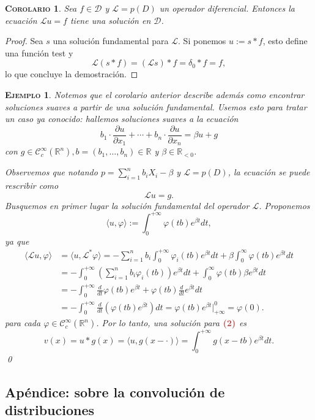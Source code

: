 \documentclass[11pt]{article}
\theoremstyle{colored}
\newtheorem{corollary}{\scshape Corolario}
\newtheorem{example}{\scshape Ejemplo}
\newcommand{\R}{\mathbb{R}}
\newcommand{\C}{\mathscr{C}}
\newcommand{\test}{\mathscr{D}}
\newcommand{\ev}[1]{\langle #1 \rangle}
\renewcommand{\L}{\mathscr{L}}
\newcommand{\paint}[1]{\color{color}{#1}}
\newcommand{\tpaint}[1]{\paint{\textbf{#1}}}
\begin{document}
\begin{corollary} Sea $f \in \test$ y $\L = p(D)$ un operador diferencial. Entonces la ecuación $\L u = f$ tiene una solución en $\test$.
\end{corollary}
\begin{proof} Sea $s$ una solución fundamental para $\L$. Si ponemos $u := s \ast f$, esto define una función test y
\[
\L (s \ast f) = (\L s) \ast f = \delta_0 \ast f = f,
\]
lo que concluye la demostración.
\end{proof}

\begin{example} Notemos que el corolario anterior describe además como encontrar soluciones suaves a partir de una solución fundamental. Usemos esto para tratar un caso ya conocido: hallemos soluciones suaves a la ecuación
\[
b_1 \cdot \frac{\partial u}{\partial x_1} + \cdots + b_n \cdot \frac{\partial u}{\partial x_n} = \beta u + g \tag{2}
\]
con $g \in \C_c^\infty(\R^n), b = (b_1, \dots, b_n) \in \R$ y $\beta \in \R_{ < 0}$. 

Observemos que notando $p = \sum_{i=1}^n b_i X_i - \beta$ y $\L = p(D)$, la ecuación se puede rescribir como
\[
\L u = g.
\]
Busquemos en primer lugar la solución fundamental del operador $\L$. Proponemos 
\[
\ev{u,\varphi} := \int_{0}^{+\infty}\varphi(tb)e^{\beta t}dt,
\]
ya que
\begin{align*}
\ev{\L u, \varphi} &= \ev{u,\L^\ast \varphi} = - \sum_{i=1}^n b_i \int_{0}^{+\infty}\varphi_i(tb)e^{\beta t}dt + \beta \int_0^{\infty}\varphi(tb)e^{\beta t}dt\\
&= -\int_{0}^{+\infty}\left(\sum_{i=1}^n b_i \varphi_i(tb)\right)e^{\beta t}dt +  \int_0^{\infty}\varphi(tb)\beta e^{\beta t}dt\\
&= - \int_{0}^{+\infty} \frac{d}{dt}\varphi(tb) e^{\beta t} + \varphi(tb)\frac{d}{dt}e^{\beta t}dt\\
&= -\int_{0}^{+\infty}\frac{d}{dt}(\varphi(tb)e^{\beta t})dt = \varphi(tb)e^{\beta t} \Bigg|_{+\infty}^0 = \varphi(0).
\end{align*}
para cada $\varphi \in \C_c^\infty(\R^n)$. Por lo tanto, una solución para $\tpaint{(2)}$ es
\[
v(x) = u \ast g(x) = \ev{u, g(x - \cdot)} = \int_{0}^{+\infty}g(x-tb)e^{\beta t}dt.
\]
\qed
\end{example}

\subsection{Apéndice: sobre la convolución de distribuciones}
\end{document}
